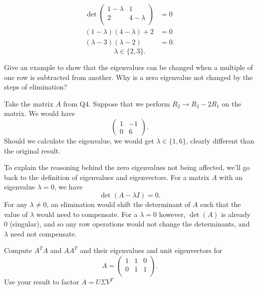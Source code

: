 \documentclass[5pt, a4paper]{article}
\begin{document}
\begin{align*}
    \det\begin{pmatrix} 
        1 - \lambda & 1 \\ 
        2 & 4 - \lambda \\
    \end{pmatrix} &= 0 \\
    (1- \lambda)(4 - \lambda) + 2 &= 0 \\
    (\lambda -3)(\lambda -2) &= 0 
.\end{align*}
\[
    \lambda \in \{2,3\} 
.\] 
\begin{tcolorbox}[title=Question 4]
    Give an example to show that the eigenvalues can be changed when a multiple
    of one row is subtracted from another. Why is a zero eigenvalue not changed
    by the steps of elimination?
\end{tcolorbox} 
Take the matrix $A$ from Q4. Suppose that we perform  $R_2 \to  R_2 - 2R_1$ on the
matrix. We would have \[
    \begin{pmatrix} 1 & -1 \\ 0 & 6 \end{pmatrix} 
.\] 
Should we calculate the eigenvalue, we would get $\lambda \in \{1,6\}$, clearly
different than the original result.

To explain the reasoning behind the zero eigenvalues not being affected, we'll
go back to the definition of eigenvalues and eigenvectors. For a matrix $A$ with
an eigenvalue $\lambda = 0$, we have \[
    \det(A - \lambda I) = 0
.\] 
For any $\lambda \neq 0$, an elimination would shift the determinant of $A$ such
that the value of $\lambda$ would need to compensate. For a $\lambda = 0$
however,  $\det(A)$ is already $0$ (singular), and so any row operations would
not change the determinants, and $\lambda$ need not compensate.

\begin{tcolorbox}[title=Question 5]
    Compute $A^T A$ and $A A^T$ and their eigenvalues and unit eigenvectors for
    \[
    A = \begin{pmatrix} 
        1 & 1 & 0 \\ 
        0 & 1 & 1 \\
    \end{pmatrix} 
    .\] 
    Use your result to factor $A = U \Sigma V^T$
\end{tcolorbox} 
\end{document}
